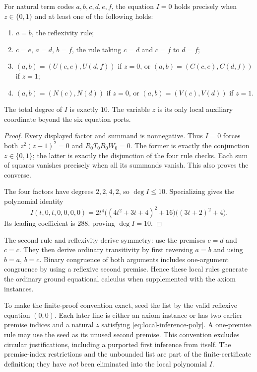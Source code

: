\begin{auxsyntaxprop}
For natural term codes $a,b,c,d,e,f$, the equation $I=0$ holds precisely
when $z\in\{0,1\}$ and at least one of the following holds:
\begin{enumerate}
 \item $a=b$, the reflexivity rule;
 \item $c=e$, $a=d$, $b=f$, the rule taking $c=d$ and $c=f$ to $d=f$;
 \item $(a,b)=(U(c,e),U(d,f))$ if $z=0$, or
       $(a,b)=(C(c,e),C(d,f))$ if $z=1$;
 \item $(a,b)=(N(c),N(d))$ if $z=0$, or
       $(a,b)=(V(c),V(d))$ if $z=1$.
\end{enumerate}
The total degree of $I$ is exactly $10$.  The variable $z$ is its only
local auxiliary coordinate beyond the six equation ports.
\end{auxsyntaxprop}
\begin{proof}
Every displayed factor and summand is nonnegative.  Thus $I=0$ forces
both $z^2(z-1)^2=0$ and $R_0T_0B_0W_0=0$.  The former is exactly the
conjunction $z\in\{0,1\}$; the latter is exactly the disjunction of
the four rule checks.  Each sum of squares vanishes precisely when all
its summands vanish.  This also proves the converse.

The four factors have degrees $2,2,4,2$, so $\deg I\le10$.
Specializing gives the polynomial identity
\[
 I(t,0,t,0,0,0,0)
 =2t^4\bigl((4t^2+3t+4)^2+16\bigr)
       \bigl((3t+2)^2+4\bigr).
\]
Its leading coefficient is $288$, proving $\deg I=10$.
\end{proof}

The second rule and reflexivity derive symmetry: use the premises
$c=d$ and $c=c$.  They then derive ordinary transitivity by first
reversing $a=b$ and using $b=a$, $b=c$.  Binary congruence of both
arguments includes one-argument congruence by using a reflexive second
premise.  Hence these local rules generate the ordinary ground
equational calculus when supplemented with the axiom instances.

To make the finite-proof convention exact, seed the list by the valid
reflexive equation $(0,0)$.  Each later line is either an axiom instance
or has two earlier premise indices and a natural $z$ satisfying
\eqref{eq:local-inference-poly}.  A one-premise rule may use the seed
as its unused second premise.  This convention excludes circular
justifications, including a purported first inference from itself.
The premise-index restrictions and the unbounded list are part of the
finite-certificate definition; they have \emph{not} been eliminated
into the local polynomial $I$.

